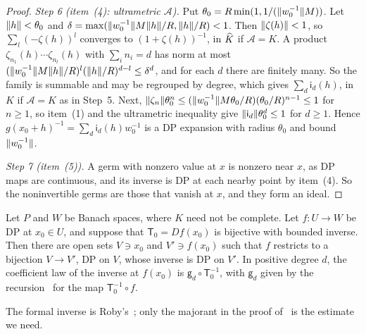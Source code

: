 \begin{proof}
\emph{Step 6 (item~(4): ultrametric $\mathcal A$).} Put $\theta_0=R\min(1,1/(\lVert w_0^{-1}\rVert M))$. Let $\lVert h\rVert<\theta_0$ and $\delta=\max(\lVert w_0^{-1}\rVert M\lVert h\rVert/R,\lVert h\rVert/R)<1$. Then $\lVert \zeta(h)\rVert<1$, so $\sum_l(-\zeta(h))^l$ converges to $(1+\zeta(h))^{-1}$, in $\widehat K$ if $\mathcal A=K$. A product $\zeta_{n_1}(h)\cdots\zeta_{n_l}(h)$ with $\sum_in_i=d$ has norm at most $(\lVert w_0^{-1}\rVert M\lVert h\rVert/R)^l(\lVert h\rVert/R)^{d-l}\le\delta^d$, and for each $d$ there are finitely many. So the family is summable and may be regrouped by degree, which gives $\sum_d\mathsf i_d(h)$, in $K$ if $\mathcal A=K$ as in Step~5. Next, $\lVert \zeta_n\rVert\theta_0^n\le(\lVert w_0^{-1}\rVert M\theta_0/R)(\theta_0/R)^{n-1}\le1$ for $n\ge1$, so item~(1) and the ultrametric inequality give $\lVert \mathsf i_d\rVert\theta_0^d\le1$ for $d\ge1$. Hence $g(x_0+h)^{-1}=\sum_d\mathsf i_d(h)w_0^{-1}$ is a DP expansion with radius $\theta_0$ and bound $\lVert w_0^{-1}\rVert$.

\emph{Step 7 (item~(5)).} A germ with nonzero value at $x$ is nonzero near $x$, as DP maps are continuous, and its inverse is DP at each nearby point by item~(4). So the noninvertible germs are those that vanish at $x$, and they form an ideal.
\end{proof}

\begin{theorem}\label{dp:thm:inverse}
Let $P$ and $W$ be Banach spaces, where $K$ need not be complete. Let $f\colon U\to W$ be DP at $x_0\in U$, and suppose that $\mathsf T_0=Df(x_0)$ is bijective with bounded inverse. Then there are open sets $V\ni x_0$ and $V'\ni f(x_0)$ such that $f$ restricts to a bijection $V\to V'$, DP on $V$, whose inverse is DP on $V'$. In positive degree $d$, the coefficient law of the inverse at $f(x_0)$ is $\mathsf g_d\circ\mathsf T_0^{-1}$, with $\mathsf g_d$ given by the recursion~\cite[(Q.14)]{I} for the map $\mathsf T_0^{-1}\circ f$.
\end{theorem}

The formal inverse is Roby's~\cite[Th.~VI.3, Prop.~VI.8]{Ro}; only the majorant in the proof of~\cite[Lemma~Q.14]{I} is the estimate we need.

